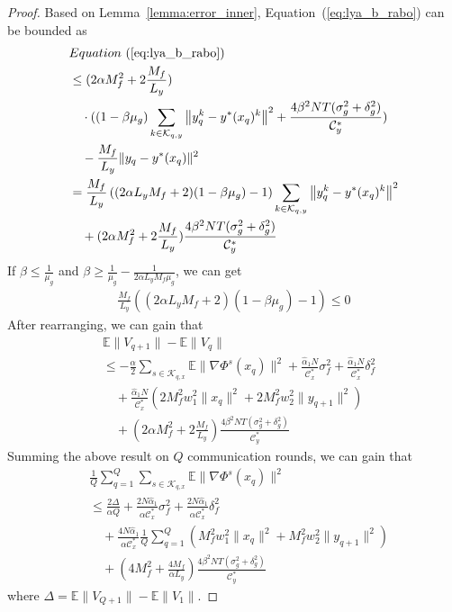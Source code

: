 \documentclass[lettersize,journal]{IEEEtran}
\begin{document}
\begin{proof}
Based on Lemma~\ref{lemma:error_inner}, Equation~(\ref{eq:lya_b_rabo}) can be bounded as
\begin{align}
    &Equation~(\ref{eq:lya_b_rabo})\nonumber\\&\leq(2\alpha M_f^2+2\frac{M_f}{L_y})\nonumber
    \\
    &\quad\cdot((1-\beta\mu_g)\sum_{k\in \mathcal{K}_{q,y}}\left\|y_{q}^k-y^*(x_q)^k\right\|^2 +\frac{4\beta^2NT(\sigma_{g}^2+\delta_{g}^2)}{\mathcal{C}^{*}_{y}})\nonumber
    \\
    &\quad-\frac{M_f}{L_y}\|y_q-y^*(x_q)\|^2
    \nonumber
    \\
    &= \frac{M_f}{L_y}\left((2\alpha L_y M_f+2)(1-\beta \mu_g)-1\right)\sum_{k\in \mathcal{K}_{q,y}}\left\|y_{q}^k-y^*(x_q)^k\right\|^2\nonumber
    \\
    &\quad+(2\alpha M_f^2+2\frac{M_f}{L_y})\frac{4\beta^2NT(\sigma_{g}^2+\delta_{g}^2)}{\mathcal{C}^{*}_{y}}
    \nonumber
\end{align}
If $\beta\leq\frac{1}{\mu_g}$ and $\beta \geq \frac{1}{\mu_g}-\frac{1}{2\alpha L_yM_f\mu_g}$, we can get  
\begin{align*}
\frac{M_f}{L_y}\left((2\alpha L_y M_f+2)(1-\beta \mu_g)-1\right)\leq0
\end{align*}
After rearranging, we can gain that
\begin{align*}
    &\mathbb{E}\| V_{q+1}\|-\mathbb{E}\|V_{q} \|\nonumber\\&\leq-\frac{\alpha}{2}\sum_{s\in \mathcal{K}_{q,x}}\mathbb{E}\|\nabla \Phi^s(x_{q})\|^2+\frac{\hat{\alpha}_1N}{\mathcal{C}_x^*}\sigma_f^2+\frac{\hat{\alpha}_1N}{\mathcal{C}_x^*}\delta^2_f\\
    &\quad+\frac{\hat{\alpha}_1N}{\mathcal{C}_x^*}(2M_f^2 w_1^2 \|x_q\|^2+2M_f^2 w_2^2 \|y_{q+1}\|^2)\\
    &\quad+(2\alpha M_f^2+2\frac{M_f}{L_y})\frac{4\beta^2NT(\sigma_{g}^2+\delta_{g}^2)}{\mathcal{C}^{*}_{y}}
\end{align*}
Summing the above result on $Q$ communication rounds, we can gain that 
\begin{align*}
     &\frac{1}{Q}\sum_{q=1}^Q\sum_{s\in \mathcal{K}_{q,x}}\mathbb{E}\|\nabla \Phi^s(x_{q})\|^2\\&\leq \frac{2\Delta}{\alpha Q}+\frac{2N\hat{\alpha}_1}{\alpha\mathcal{C}_x^*}\sigma_f^2+\frac{2N\hat{\alpha}_1}{\alpha\mathcal{C}_x^*}\delta^2_f\\&\quad+\frac{4N\hat{\alpha}_1}{\alpha\mathcal{C}_x^*}\frac{1}{Q}\sum_{q=1}^Q(M_f^2 w_1^2 \|x_q\|^2+M_f^2 w_2^2 \|y_{q+1}\|^2)\\
     &\quad+(4M_f^2+\frac{4M_f}{\alpha L_y})\frac{4\beta^2NT(\sigma_{g}^2+\delta_{g}^2)}{\mathcal{C}^{*}_{y}}
\end{align*}
where $\Delta=\mathbb{E}\|V_{Q+1}\|-\mathbb{E}\| V_{1}\|$.


\end{proof}
\end{document}
